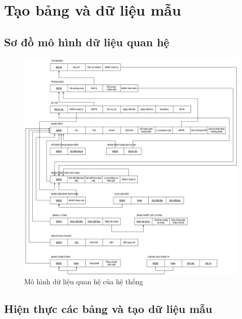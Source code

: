 \section{Tạo bảng và dữ liệu mẫu}
\subsection{Sơ đồ mô hình dữ liệu quan hệ}
\begin{figure}[H]
    \centering
    \includegraphics[width=\linewidth]{content/images/relational-mapping.jpg}
    \caption{Mô hình dữ liệu quan hệ của hệ thống}
    \label{fig:relational-mapping}
\end{figure}

\newpage
\subsection{Hiện thực các bảng và tạo dữ liệu mẫu}
